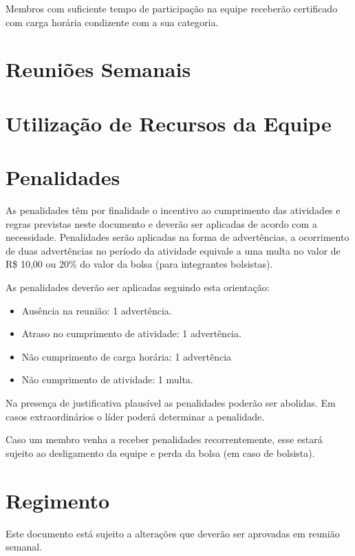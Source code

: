 Membros com suficiente tempo de participação na equipe receberão certificado com carga horária condizente com a sua categoria.

\chapter{Reuniões Semanais}
\label{chp:reunioes}


\chapter{Utilização de Recursos da Equipe}
\label{chp:recursos}


\chapter{Penalidades}
\label{chp:penalidades}
As penalidades têm por finalidade o incentivo ao cumprimento das atividades e regras previstas neste documento e deverão ser aplicadas de acordo com a necessidade. Penalidades serão aplicadas na forma de advertências, a ocorrimento de duas advertências  no período da atividade equivale a uma multa no valor de R\$ 10,00 ou 20\% do valor da bolsa (para integrantes bolsistas).

As penalidades deverão ser aplicadas seguindo esta orientação:
\begin{itemize}
\item[] Ausência na reunião: 1 advertência.
\item[] Atraso no cumprimento de atividade: 1 advertência.
\item[] Não cumprimento de carga horária: 1 advertência
\item[] Não cumprimento de atividade: 1 multa.
\end{itemize}
Na presença de justificativa plausível as penalidades poderão ser abolidas. Em casos extraordinários o líder poderá determinar a penalidade.

Caso um membro venha a receber penalidades recorrentemente, esse estará sujeito ao desligamento da equipe e perda da bolsa (em caso de bolsista).


\chapter{Regimento}
\label{chp:regimento}

Este documento está sujeito a alterações que deverão ser aprovadas em reunião semanal.